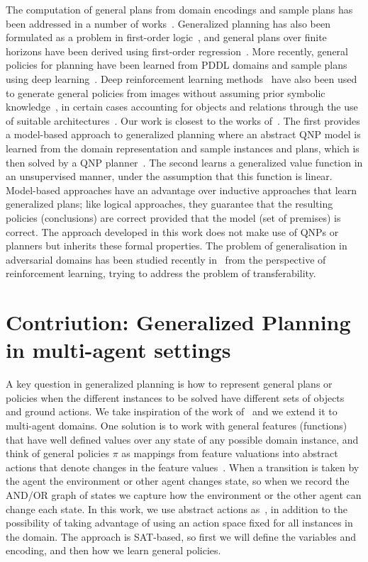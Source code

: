 \documentclass[a4paper]{article}
\begin{document}
The computation of general plans from domain encodings and sample plans has been addressed in a number of works~\cite{cui2019stochastic, fern2003approximate, silver2020pddlgym}. Generalized planning has also been formulated as a problem in first-order logic~\cite{srivastava2011environment, on2019symbolic}, and general plans over finite horizons have been derived using first-order regression~\cite{boutilier2001symbolic, wang2008first, sanner2009practical}. More recently, general policies for planning have been learned from PDDL domains and sample plans using deep learning~\cite{toyer2018action, gargmausam}. Deep reinforcement learning methods~\cite{mnih2015human} have also been used to generate general policies from images without assuming prior symbolic knowledge~\cite{groshev2018learning,hui2020babyai}, in certain cases accounting for objects and relations through the use of suitable architectures~\cite{garnelo2019reconciling}. Our work  is closest to the works of~\cite{frances2021learning}. The first provides a model-based approach to generalized planning where an abstract QNP model is learned from the domain representation and sample instances and plans, which is then solved by a QNP planner~\cite{bonet2020general}. The second learns a generalized value function in an unsupervised manner, under the assumption that this function is linear. Model-based approaches have an advantage over inductive approaches that learn generalized plans; like logical approaches, they guarantee that the resulting policies (conclusions) are correct provided that the model (set of premises) is correct. The approach developed in this work does not make use of QNPs or planners but inherits these formal properties. The problem of generalisation in adversarial domains has been studied recently in~\cite{zhang2021understanding, subramani2020learning} from the perspective of reinforcement learning, trying to address the problem of transferability.


\section{Contriution: Generalized Planning in multi-agent settings}

A key question in generalized planning is how to represent general plans or policies when the different instances to be solved have different sets of objects and ground actions. We take inspiration of the work of~\cite{frances2021learning} and we extend it to multi-agent domains. One solution is to work with general features (functions) that have well defined values over any state of any possible domain instance, and think of general policies $\pi$ as mappings from feature valuations into abstract actions that denote changes in the feature values~\cite{bandres2018planning}. When a transition is taken by the agent the environment or other agent changes state, so when we record the AND/OR graph of states we capture how the environment or the other agent can change each state. In this work, we use abstract actions as~\cite{frances2021learning}, in addition to the possibility of taking advantage of using an action space fixed for all instances in the domain.  The approach is SAT-based, so first we will define the variables and encoding, and then how we learn general policies.
\end{document}
